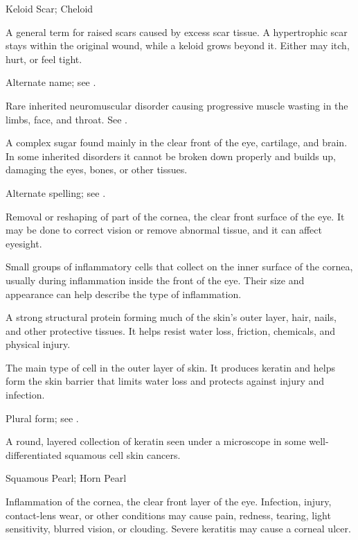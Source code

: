\synonyms
Keloid Scar; Cheloid

 A general term for raised scars caused by excess scar tissue. A hypertrophic scar stays within the original wound, while a keloid grows beyond it. Either may itch, hurt, or feel tight.

 Alternate name; see .

 Rare inherited neuromuscular disorder causing progressive muscle wasting in the limbs, face, and throat. See .

 A complex sugar found mainly in the clear front of the eye, cartilage, and brain. In some inherited disorders it cannot be broken down properly and builds up, damaging the eyes, bones, or other tissues.

 Alternate spelling; see .

 Removal or reshaping of part of the cornea, the clear front surface of the eye. It may be done to correct vision or remove abnormal tissue, and it can affect eyesight.

 Small groups of inflammatory cells that collect on the inner surface of the cornea, usually during inflammation inside the front of the eye. Their size and appearance can help describe the type of inflammation.

 A strong structural protein forming much of the skin’s outer layer, hair, nails, and other protective tissues. It helps resist water loss, friction, chemicals, and physical injury.

 The main type of cell in the outer layer of skin. It produces keratin and helps form the skin barrier that limits water loss and protects against injury and infection.

 Plural form; see .

 A round, layered collection of keratin seen under a microscope in some well-differentiated squamous cell skin cancers.

\synonyms
Squamous Pearl; Horn Pearl

 Inflammation of the cornea, the clear front layer of the eye. Infection, injury, contact-lens wear, or other conditions may cause pain, redness, tearing, light sensitivity, blurred vision, or clouding. Severe keratitis may cause a corneal ulcer.

